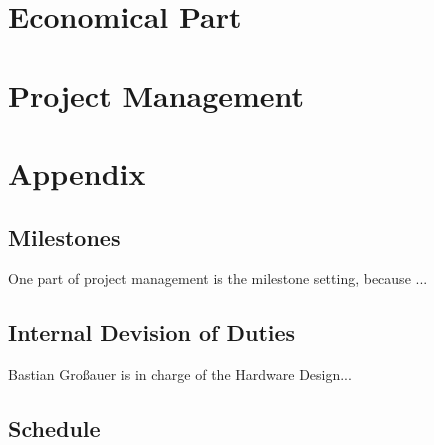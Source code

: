 \documentclass[12pt]{article}
\begin{document}

\section{Economical Part}



\cleardoublepage


\section{Project Management}



\cleardoublepage


\appendix

\section{Appendix}


\subsection{Milestones}

One part of project management is the milestone setting, because ...


\subsection{Internal Devision of Duties}

Bastian Großauer is in charge of the Hardware Design...

\subsection{Schedule}
\end{document}

